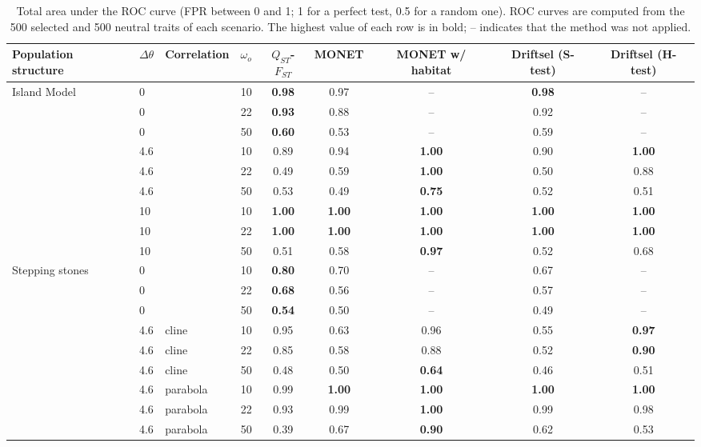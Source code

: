 \begin{table}[ht]
\centering
\caption{Total area under the ROC curve (FPR between 0 and 1; 1 for a perfect test, 0.5 for a random one). ROC curves are computed from the 500 selected and 500 neutral traits of each scenario. The highest value of each row is in bold; -- indicates that the method was not applied.}
\label{tab:auc_total}
\begin{tabular}{lllrccccc}
\toprule
Population structure & $\Delta\theta$ & Correlation & $\omega_o$ & $Q_{ST}$-$F_{ST}$ & MONET & MONET w/ habitat & Driftsel (S-test) & Driftsel (H-test) \\
\midrule
Island Model & 0 &  & 10 & \textbf{0.98} & 0.97 & -- & \textbf{0.98} & -- \\
 & 0 &  & 22 & \textbf{0.93} & 0.88 & -- & 0.92 & -- \\
 & 0 &  & 50 & \textbf{0.60} & 0.53 & -- & 0.59 & -- \\
 & 4.6 &  & 10 & 0.89 & 0.94 & \textbf{1.00} & 0.90 & \textbf{1.00} \\
 & 4.6 &  & 22 & 0.49 & 0.59 & \textbf{1.00} & 0.50 & 0.88 \\
 & 4.6 &  & 50 & 0.53 & 0.49 & \textbf{0.75} & 0.52 & 0.51 \\
 & 10 &  & 10 & \textbf{1.00} & \textbf{1.00} & \textbf{1.00} & \textbf{1.00} & \textbf{1.00} \\
 & 10 &  & 22 & \textbf{1.00} & \textbf{1.00} & \textbf{1.00} & \textbf{1.00} & \textbf{1.00} \\
 & 10 &  & 50 & 0.51 & 0.58 & \textbf{0.97} & 0.52 & 0.68 \\
\midrule
Stepping stones & 0 &  & 10 & \textbf{0.80} & 0.70 & -- & 0.67 & -- \\
 & 0 &  & 22 & \textbf{0.68} & 0.56 & -- & 0.57 & -- \\
 & 0 &  & 50 & \textbf{0.54} & 0.50 & -- & 0.49 & -- \\
 & 4.6 & cline & 10 & 0.95 & 0.63 & 0.96 & 0.55 & \textbf{0.97} \\
 & 4.6 & cline & 22 & 0.85 & 0.58 & 0.88 & 0.52 & \textbf{0.90} \\
 & 4.6 & cline & 50 & 0.48 & 0.50 & \textbf{0.64} & 0.46 & 0.51 \\
 & 4.6 & parabola & 10 & 0.99 & \textbf{1.00} & \textbf{1.00} & \textbf{1.00} & \textbf{1.00} \\
 & 4.6 & parabola & 22 & 0.93 & 0.99 & \textbf{1.00} & 0.99 & 0.98 \\
 & 4.6 & parabola & 50 & 0.39 & 0.67 & \textbf{0.90} & 0.62 & 0.53 \\

\end{tabular}
\end{table}
